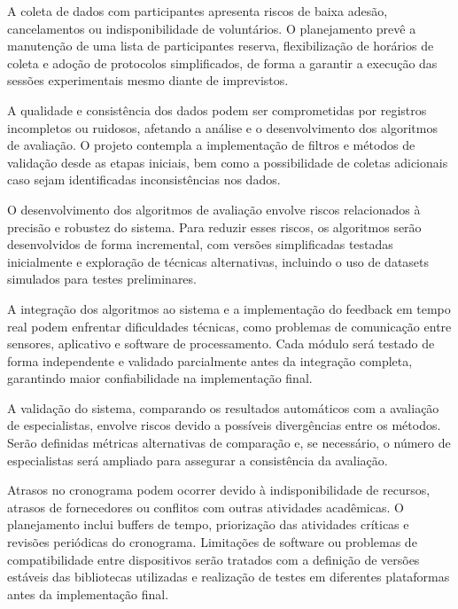 A coleta de dados com participantes apresenta riscos de baixa adesão, cancelamentos ou indisponibilidade de voluntários. O planejamento prevê a manutenção de uma lista de participantes reserva, flexibilização de horários de coleta e adoção de protocolos simplificados, de forma a garantir a execução das sessões experimentais mesmo diante de imprevistos.

A qualidade e consistência dos dados podem ser comprometidas por registros incompletos ou ruidosos, afetando a análise e o desenvolvimento dos algoritmos de avaliação. O projeto contempla a implementação de filtros e métodos de validação desde as etapas iniciais, bem como a possibilidade de coletas adicionais caso sejam identificadas inconsistências nos dados.

O desenvolvimento dos algoritmos de avaliação envolve riscos relacionados à precisão e robustez do sistema. Para reduzir esses riscos, os algoritmos serão desenvolvidos de forma incremental, com versões simplificadas testadas inicialmente e exploração de técnicas alternativas, incluindo o uso de datasets simulados para testes preliminares.

A integração dos algoritmos ao sistema e a implementação do feedback em tempo real podem enfrentar dificuldades técnicas, como problemas de comunicação entre sensores, aplicativo e software de processamento. Cada módulo será testado de forma independente e validado parcialmente antes da integração completa, garantindo maior confiabilidade na implementação final.

A validação do sistema, comparando os resultados automáticos com a avaliação de especialistas, envolve riscos devido a possíveis divergências entre os métodos. Serão definidas métricas alternativas de comparação e, se necessário, o número de especialistas será ampliado para assegurar a consistência da avaliação.

Atrasos no cronograma podem ocorrer devido à indisponibilidade de recursos, atrasos de fornecedores ou conflitos com outras atividades acadêmicas. O planejamento inclui buffers de tempo, priorização das atividades críticas e revisões periódicas do cronograma. Limitações de software ou problemas de compatibilidade entre dispositivos serão tratados com a definição de versões estáveis das bibliotecas utilizadas e realização de testes em diferentes plataformas antes da implementação final.